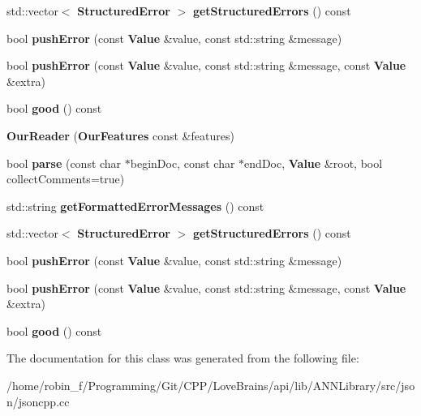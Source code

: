 \begin{DoxyCompactItemize}
\item 
std\+::vector$<$ {\bf Structured\+Error} $>$ {\bfseries get\+Structured\+Errors} () const \label{class_json_1_1_our_reader_a2f7d35771be02703be2d0ac1877bc149}

\item 
bool {\bfseries push\+Error} (const {\bf Value} \&value, const std\+::string \&message)\label{class_json_1_1_our_reader_aef7aa4ca22ffaa38c401b16951d20e1e}

\item 
bool {\bfseries push\+Error} (const {\bf Value} \&value, const std\+::string \&message, const {\bf Value} \&extra)\label{class_json_1_1_our_reader_ad43315cbb0d6804e3b7177e84a1ec53d}

\item 
bool {\bfseries good} () const \label{class_json_1_1_our_reader_a048346238d703ad9aed06beb686e6102}

\item 
{\bfseries Our\+Reader} ({\bf Our\+Features} const \&features)\label{class_json_1_1_our_reader_a48a850914b9c8d7781be172930c478e5}

\item 
bool {\bfseries parse} (const char $\ast$begin\+Doc, const char $\ast$end\+Doc, {\bf Value} \&root, bool collect\+Comments=true)\label{class_json_1_1_our_reader_aba4f8749aab7f02ec17f107e392caf80}

\item 
std\+::string {\bfseries get\+Formatted\+Error\+Messages} () const \label{class_json_1_1_our_reader_ae9cbb7dbd9c6c96be37432e8dfa1afcb}

\item 
std\+::vector$<$ {\bf Structured\+Error} $>$ {\bfseries get\+Structured\+Errors} () const \label{class_json_1_1_our_reader_a2f7d35771be02703be2d0ac1877bc149}

\item 
bool {\bfseries push\+Error} (const {\bf Value} \&value, const std\+::string \&message)\label{class_json_1_1_our_reader_aef7aa4ca22ffaa38c401b16951d20e1e}

\item 
bool {\bfseries push\+Error} (const {\bf Value} \&value, const std\+::string \&message, const {\bf Value} \&extra)\label{class_json_1_1_our_reader_ad43315cbb0d6804e3b7177e84a1ec53d}

\item 
bool {\bfseries good} () const \label{class_json_1_1_our_reader_a048346238d703ad9aed06beb686e6102}

\end{DoxyCompactItemize}


The documentation for this class was generated from the following file\+:\begin{DoxyCompactItemize}
\item 
/home/robin\+\_\+f/\+Programming/\+Git/\+C\+P\+P/\+Love\+Brains/api/lib/\+A\+N\+N\+Library/src/json/jsoncpp.\+cc\end{DoxyCompactItemize}
